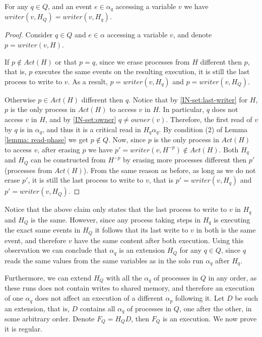 \begin{claim-subsection} \label{claim:Q-same-writer}
	For any $q \in Q$, and an event $e \in \alpha_q$ accessing a variable $v$ we have $writer(v,H_Q) = writer(v,H_q)$.
\end{claim-subsection}

\begin{proof}
	Consider $q \in Q$ and $e \in \alpha$ accessing a variable $v$, and denote $p = writer(v,H)$.
	
	If $p \notin Act(H)$ or that $p = q$, since we erase processes from $H$ different then $p$, that is, $p$ executes the same events on the resulting execution, it is still the last process to write to $v$. As a result, $p = writer(v,H_q)$ and $p = writer(v,H_Q)$.
	
	Otherwise $p \in Act(H)$ different then $q$. Notice that by \ref{IN-set:last-writer} for $H$, $p$ is the only process in $Act(H)$ to access $v$ in $H$. In particular, $q$ does not access $v$ in $H$, and by \ref{IN-set:owner} $q \neq owner(v)$. Therefore, the first read of $v$ by $q$ is in $\alpha_q$, and thus it is a critical read in $H_q \alpha_q$. By condition (2) of Lemma \ref{lemma: read-phase} we get $p \notin Q$. Now, since $p$ is the only process in $Act(H)$ to access $v$, after erasing $p$ we have $p' = writer(v,H^{-p}) \notin Act(H)$. Both $H_q$ and $H_Q$ can be constructed from $H^{-p}$ by erasing more processes different then $p'$ (processes from $Act(H)$). From the same reason as before, as long as we do not erase $p'$, it is still the last process to write to $v$, that is $p' = writer(v,H_q)$ and $p' = writer(v,H_Q)$.
\end{proof}

Notice that the above claim only states that the last process to write to $v$ in $H_q$ and $H_Q$ is the same. However, since any process taking steps in $H_q$ is executing the exact same events in $H_Q$ it follows that its last write to $v$ in both is the same event, and therefore $v$ have the same content after both execution. Using this observation we can conclude that $\alpha_q$ is an extension $H_Q$ for any $q \in Q$, since $q$ reads the same values from the same variables as in the solo run $\alpha_q$ after $H_q$.

Furthermore, we can extend $H_Q$ with all the $\alpha_q$ of processes in $Q$ in any order, as these runs does not contain writes to shared memory, and therefore an execution of one $\alpha_q$ does not affect an execution of a different $\alpha_p$ following it. Let $D$ be such an extension, that is, $D$ contains all $\alpha_q$ of processes in $Q$, one after the other, in some arbitrary order. Denote $F_Q = H_Q D$, then $F_Q$ is an execution. We now prove it is regular.

